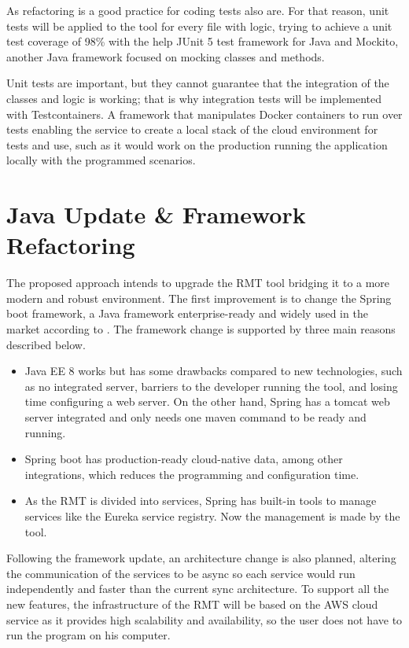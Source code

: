 As refactoring is a good practice for coding tests also are. For that reason, unit tests will be applied to the tool for every file with logic, trying to achieve a unit test coverage of 98\% with the help JUnit 5 test framework for Java and Mockito, another Java framework focused on mocking classes and methods.

Unit tests are important, but they cannot guarantee that the integration of the classes and logic is working; that is why integration tests will be implemented with Testcontainers. A framework that manipulates Docker containers to run over tests enabling the service to create a local stack of the cloud environment for tests and use, such as it would work on the production running the application locally with the programmed scenarios.

\section{Java Update \& Framework Refactoring}
\label{sec-framework}

The proposed approach intends to upgrade the RMT tool bridging it to a more modern and robust environment. The first improvement is to change the Spring boot framework, a Java framework enterprise-ready and widely used in the market according to \textcite{Mythily2022}. The framework change is supported by three main reasons described below.
\begin{itemize}
\item Java EE 8 works but has some drawbacks compared to new technologies, such as no integrated server, barriers to the developer running the tool, and losing time configuring a web server. On the other hand, Spring has a tomcat web server integrated and only needs one maven command to be ready and running.
\item Spring boot has production-ready cloud-native data, among other integrations, which reduces the programming and configuration time.
\item As the RMT is divided into services, Spring has built-in tools to manage services like the Eureka service registry. Now the management is made by the tool.
\end{itemize}

Following the framework update, an architecture change is also planned, altering the communication of the services to be async so each service would run independently and faster than the current sync architecture. To support all the new features, the infrastructure of the RMT will be based on the AWS cloud service as it provides high scalability and availability, so the user does not have to run the program on his computer.

